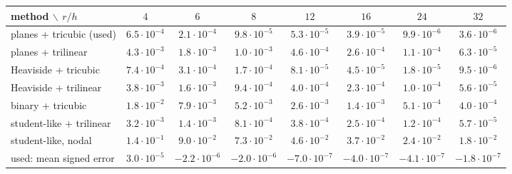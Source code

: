 \begin{tabular}{lccccccc}
\toprule
method $\backslash$ $r/h$ & $4$ & $6$ & $8$ & $12$ & $16$ & $24$ & $32$ \\
\midrule
planes + tricubic (used) & $6.5\cdot 10^{-4}$ & $2.1\cdot 10^{-4}$ & $9.8\cdot 10^{-5}$ & $5.3\cdot 10^{-5}$ & $3.9\cdot 10^{-5}$ & $9.9\cdot 10^{-6}$ & $3.6\cdot 10^{-6}$ \\
planes + trilinear & $4.3\cdot 10^{-3}$ & $1.8\cdot 10^{-3}$ & $1.0\cdot 10^{-3}$ & $4.6\cdot 10^{-4}$ & $2.6\cdot 10^{-4}$ & $1.1\cdot 10^{-4}$ & $6.3\cdot 10^{-5}$ \\
Heaviside + tricubic & $7.4\cdot 10^{-4}$ & $3.1\cdot 10^{-4}$ & $1.7\cdot 10^{-4}$ & $8.1\cdot 10^{-5}$ & $4.5\cdot 10^{-5}$ & $1.8\cdot 10^{-5}$ & $9.5\cdot 10^{-6}$ \\
Heaviside + trilinear & $3.8\cdot 10^{-3}$ & $1.6\cdot 10^{-3}$ & $9.4\cdot 10^{-4}$ & $4.0\cdot 10^{-4}$ & $2.3\cdot 10^{-4}$ & $1.0\cdot 10^{-4}$ & $5.6\cdot 10^{-5}$ \\
binary + tricubic & $1.8\cdot 10^{-2}$ & $7.9\cdot 10^{-3}$ & $5.2\cdot 10^{-3}$ & $2.6\cdot 10^{-3}$ & $1.4\cdot 10^{-3}$ & $5.1\cdot 10^{-4}$ & $4.0\cdot 10^{-4}$ \\
student-like + trilinear & $3.2\cdot 10^{-3}$ & $1.4\cdot 10^{-3}$ & $8.1\cdot 10^{-4}$ & $3.8\cdot 10^{-4}$ & $2.5\cdot 10^{-4}$ & $1.2\cdot 10^{-4}$ & $5.7\cdot 10^{-5}$ \\
student-like, nodal & $1.4\cdot 10^{-1}$ & $9.0\cdot 10^{-2}$ & $7.3\cdot 10^{-2}$ & $4.6\cdot 10^{-2}$ & $3.7\cdot 10^{-2}$ & $2.4\cdot 10^{-2}$ & $1.8\cdot 10^{-2}$ \\
\midrule
used: mean signed error & $3.0\cdot 10^{-5}$ & $-2.2\cdot 10^{-6}$ & $-2.0\cdot 10^{-6}$ & $-7.0\cdot 10^{-7}$ & $-4.0\cdot 10^{-7}$ & $-4.1\cdot 10^{-7}$ & $-1.8\cdot 10^{-7}$ \\
\bottomrule
\end{tabular}
